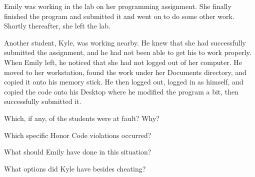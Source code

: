 
Emily was working in the lab on her programming assignment.
She finally finished the program and submitted it and went on to do some other work.
Shortly thereafter, she left the lab.

\vspace{1em}

Another student, Kyle, was working nearby.
He knew that she had successfully submitted the assignment, and he had not been able to get his to work properly.
When Emily left, he noticed that she had not logged out of her computer.
He moved to her workstation, found the work under her Documents directory, and copied it onto his memory stick.
He then logged out, logged in as himself, and copied the code onto his Desktop where he modified the program a bit, then successfully submitted it.




\Q Which, if any, of the students were at fault? Why?

\begin{answer}
\end{answer}


\Q Which specific Honor Code violations occurred?

\begin{answer}
\end{answer}


\Q What should Emily have done in this situation?

\begin{answer}
\end{answer}


\Q What options did Kyle have besides cheating?

\begin{answer}
\end{answer}
